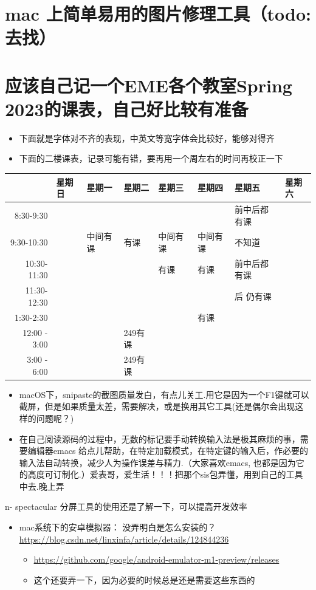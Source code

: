 \documentclass[9pt, b5paper]{article}
\begin{document}
\section{mac 上简单易用的图片修理工具（todo: 去找）}
\label{sec-7}
\section{应该自己记一个EME各个教室Spring 2023的课表，自己好比较有准备}
\label{sec-8}
\begin{itemize}
\item 下面就是字体对不齐的表现，中英文等宽字体会比较好，能够对得齐
\item 下面的二楼课表，记录可能有错，要再用一个周左右的时间再校正一下
\end{itemize}
\begin{center}
\begin{tabular}{rlllllll}
\hline
 & 星期日 & 星期一 & 星期二 & 星期三 & 星期四 & 星期五 & 星期六\\
\hline
8:30-9:30 &  &  &  &  &  & 前中后都有课 & \\
9:30-10:30 &  & 中间有课 & 有课 & 中间有 课 & 中间有课 & 不知道 & \\
10:30-11:30 &  &  &  & 有课 & 有课 & 前中后都有课 & \\
11:30-12:30 &  &  &  &  &  & 后 仍有课 & \\
\hline
1:30-2:30 &  &  &  &  & 有课 &  & \\
12:00 - 3:00 &  &  & 249有课 &  &  &  & \\
3:00 - 6:00 &  &  & 249有课 &  &  &  & \\
\hline
\end{tabular}
\end{center}
\begin{itemize}
\item macOS下，snipaste的截图质量发白，有点儿关工.用它是因为一个F1键就可以截屏，但是如果质量太差，需要解决，或是换用其它工具(还是偶尔会出现这样的问题呢？)
\item 在自己阅读源码的过程中，无数的标记要手动转换输入法是极其麻烦的事，需要编辑器emacs 给点儿帮助，在特定加载模式，在特定键的输入后，作必要的输入法自动转换，减少人为操作误差与精力.（大家喜欢emacs, 也都是因为它的高度可订制化.）爱表哥，爱生活！！！把那个sis包弄懂，用到自己的工具中去.晚上弄
\end{itemize}
n- spectacular 分屏工具的使用还是了解一下，可以提高开发效率
\begin{itemize}
\item mac系统下的安卓模拟器： 没弄明白是怎么安装的？\url{https://blog.csdn.net/linxinfa/article/details/124844236}
\begin{itemize}
\item \url{https://github.com/google/android-emulator-m1-preview/releases}
\item 这个还要弄一下，因为必要的时候总是还是需要这些东西的
\end{itemize}
\end{itemize}
\end{document}
